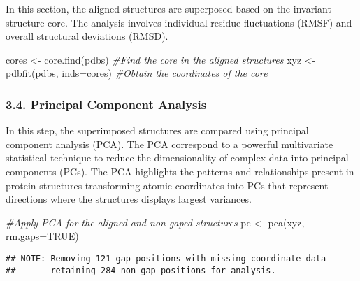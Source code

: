\documentclass[
]{article}
\newenvironment{Shaded}{\begin{snugshade}}{\end{snugshade}}
\newcommand{\AttributeTok}[1]{\textcolor[rgb]{0.77,0.63,0.00}{#1}}
\newcommand{\CommentTok}[1]{\textcolor[rgb]{0.56,0.35,0.01}{\textit{#1}}}
\newcommand{\ConstantTok}[1]{\textcolor[rgb]{0.00,0.00,0.00}{#1}}
\newcommand{\DecValTok}[1]{\textcolor[rgb]{0.00,0.00,0.81}{#1}}
\newcommand{\FunctionTok}[1]{\textcolor[rgb]{0.00,0.00,0.00}{#1}}
\newcommand{\NormalTok}[1]{#1}
\newcommand{\OtherTok}[1]{\textcolor[rgb]{0.56,0.35,0.01}{#1}}
\newcommand{\SpecialCharTok}[1]{\textcolor[rgb]{0.00,0.00,0.00}{#1}}
\begin{document}
In this section, the aligned structures are superposed based on the
invariant structure core. The analysis involves individual residue
fluctuations (RMSF) and overall structural deviations (RMSD).

\begin{Shaded}
\begin{Highlighting}[]
\NormalTok{cores }\OtherTok{\textless{}{-}} \FunctionTok{core.find}\NormalTok{(pdbs) }\CommentTok{\#Find the core in the aligned structures}
\NormalTok{xyz }\OtherTok{\textless{}{-}} \FunctionTok{pdbfit}\NormalTok{(pdbs, }\AttributeTok{inds=}\NormalTok{cores) }\CommentTok{\#Obtain the coordinates of the core}
\end{Highlighting}
\end{Shaded}

\hypertarget{principal-component-analysis}{%
\subsubsection{3.4. Principal Component
Analysis}\label{principal-component-analysis}}

In this step, the superimposed structures are compared using principal
component analysis (PCA). The PCA correspond to a powerful multivariate
statistical technique to reduce the dimensionality of complex data into
principal components (PCs). The PCA highlights the patterns and
relationships present in protein structures transforming atomic
coordinates into PCs that represent directions where the structures
displays largest variances.

\begin{Shaded}
\begin{Highlighting}[]
\CommentTok{\#Apply PCA for the aligned and non{-}gaped structures}
\NormalTok{pc }\OtherTok{\textless{}{-}} \FunctionTok{pca}\NormalTok{(xyz, }\AttributeTok{rm.gaps=}\ConstantTok{TRUE}\NormalTok{)}
\end{Highlighting}
\end{Shaded}

\begin{verbatim}
## NOTE: Removing 121 gap positions with missing coordinate data
##       retaining 284 non-gap positions for analysis.
\end{verbatim}

\begin{Shaded}
\end{Shaded}
\end{document}

